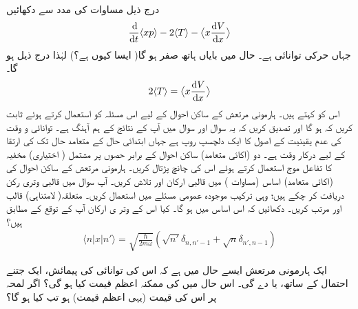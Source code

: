 \quad
 درج ذیل مساوات  کی مدد سے دکھائیں 
\begin{align}
\frac{\dif}{\dif t} \langle xp \rangle -2\langle T \rangle - \big\langle x \frac{\dif V}{\dif x} \big\rangle
\end{align}
جہاں  حرکی توانائی  ہے۔ حال میں بایاں ہاتھ صفر ہو گا( ایسا کیوں ہے؟) لہٰذا درج ذیل ہو گا۔
\begin{align}
2\langle T \rangle = \big\langle x \frac{\dif V}{\dif x} \big\rangle
\end{align}
اس کو  کہتے ہیں۔ ہارمونی مرتعش کے ساکن احوال کے لیے اس مسئلہ کو استعمال کرتے ہوئے ثابت کریں کہ  ہو گا اور تصدیق کریں کہ یہ سوال اور سوال  میں آپ کے نتائج کے ہم آہنگ ہے۔
توانائی و وقت کی عدم یقینیت کے اصول کا ایک دلچسپ روپ  ہے جہاں ابتدائی حال  کے متعامد  حال تک  کی ارتقا کے لیے درکار وقت  ہے۔ دو (اکائی متعامد) ساکن احوال کے برابر حصوں پر مشتمل ( اختیاری) مخفیہ کا تفاعل موج  استعمال کرتے ہوئے اس کی چانچ پڑتال کریں۔
 
ہارمونی مرتعش کے ساکن احوال کی (اکائی متعامد) اساس (مساوات ) میں قالبی ارکان  اور  تلاش کریں۔ آپ سوال  میں قالبی وتری رکن  دریافت کر چکے ہیں؛ وہی ترکیب موجودہ عمومی مسئلے میں استعمال کریں۔ متعلقہ( لامتناہی) قالب  اور  مرتب کریں۔ دکھائیں کہ اس اساس میں
 ہو گا۔ کیا اس کے وتر ی ارکان آپ کے توقع کے مطابق ہیں؟
\begin{align}
\langle n|x|n'\rangle=\sqrt{\frac{\hslash}{2m\omega}}(\sqrt{n'}\delta_{n,n'-1}+\sqrt{n}\delta_{n',n-1})
\end{align}

ایک ہارمونی مرتعش ایسے حال میں ہے کہ اس کی توانائی کی پیمائش، ایک جتنے احتمال کے ساتھ،  یا  دے گی۔ اس حال میں  کی  ممکنہ اعظم  قیمت کیا ہو گی؟ اگر لمحہ  پر اس کی قیمت (یہی اعظم قیمت) ہو تب  کیا ہو گا؟

